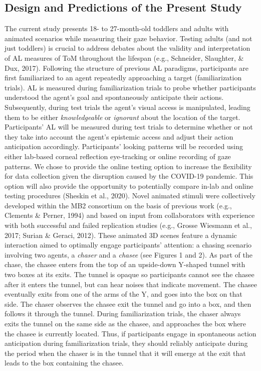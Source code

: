 \documentclass[
  man,floatsintext]{apa6}
\begin{document}
\subsection{Design and Predictions of the Present Study}\label{design-and-predictions-of-the-present-study}

The current study presents 18- to 27-month-old toddlers and adults with animated scenarios while measuring their gaze behavior. Testing adults (and not just toddlers) is crucial to address debates about the validity and interpretation of AL measures of ToM throughout the lifespan (e.g., Schneider, Slaughter, \& Dux, 2017). Following the structure of previous AL paradigms, participants are first familiarized to an agent repeatedly approaching a target (familiarization trials). AL is measured during familiarization trials to probe whether participants understood the agent's goal and spontaneously anticipate their actions. Subsequently, during test trials the agent's visual access is manipulated, leading them to be either \emph{knowledgeable} or \emph{ignorant} about the location of the target. Participants' AL will be measured during test trials to determine whether or not they take into account the agent's epistemic access and adjust their action anticipation accordingly. Participants' looking patterns will be recorded using either lab-based corneal reflection eye-tracking or online recording of gaze patterns. We chose to provide the online testing option to increase the flexibility for data collection given the disruption caused by the COVID-19 pandemic. This option will also provide the opportunity to potentially compare in-lab and online testing procedures (Sheskin et al., 2020).
Novel animated stimuli were collectively developed within the MB2 consortium on the basis of previous work (e.g., Clements \& Perner, 1994) and based on input from collaborators with experience with both successful and failed replication studies (e.g., Grosse Wiesmann et al., 2017; Surian \& Geraci, 2012). These animated 3D scenes feature a dynamic interaction aimed to optimally engage participants' attention: a chasing scenario involving two agents, a \emph{chaser} and a \emph{chasee} (see Figures 1 and 2). As part of the chase, the chasee enters from the top of an upside-down Y-shaped tunnel with two boxes at its exits. The tunnel is opaque so participants cannot see the chasee after it enters the tunnel, but can hear noises that indicate movement. The chasee eventually exits from one of the arms of the Y, and goes into the box on that side. The chaser observes the chasee exit the tunnel and go into a box, and then follows it through the tunnel. During familiarization trials, the chaser always exits the tunnel on the same side as the chasee, and approaches the box where the chasee is currently located. Thus, if participants engage in spontaneous action anticipation during familiarization trials, they should reliably anticipate during the period when the chaser is in the tunnel that it will emerge at the exit that leads to the box containing the chasee.
\end{document}
